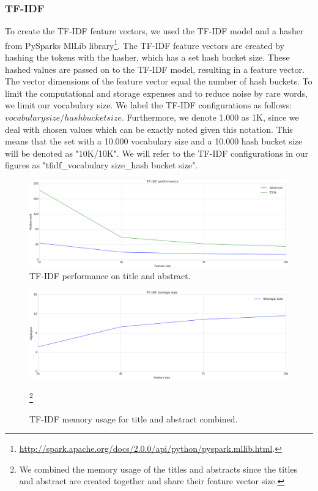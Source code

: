 \documentclass[../../Thesis.tex]{subfiles}
\begin{document}
\subsubsection{TF-IDF}
To create the TF-IDF feature vectors, we used the TF-IDF model and a hasher from PySparks MlLib library\footnote{\url{http://spark.apache.org/docs/2.0.0/api/python/pyspark.mllib.html}.}. The TF-IDF feature vectors are created by hashing the tokens with the hasher, which has a set hash bucket size. These hashed values are passed on to the TF-IDF model, resulting in a feature vector. The vector dimensions of the feature vector equal the number of hash buckets. To limit the computational and storage expenses and to reduce noise by rare words, we limit our vocabulary size.
We label the TF-IDF configurations as follows: $vocabulary size/hash bucket size$. Furthermore, we denote 1.000 as 1K, since we deal with chosen values which can be exactly noted given this notation. This means that the set with a 10.000 vocabulary size and a 10.000 hash bucket size will be denoted as "10K/10K". We will refer to the TF-IDF configurations in our figures as "tfidf\_vocabulary size\_hash bucket size".
\begin{figure}[hbt]
\includegraphics[width=5in]{Plots/tfidf_selection_plot_performance}
\caption{TF-IDF performance on title and abstract.}\label{figure:tfidfPerformance}
\end{figure}
\begin{figure}[hbt]
\includegraphics[width=5in]{Plots/tfidf_selection_plot_memory}
\caption{TF-IDF memory usage for title and abstract combined.}\footnote{We combined the memory usage of the titles and abstracts since the titles and abstract are created together and share their feature vector size.}\label{figure:tfidfMemory}
\end{figure}
\end{document}
